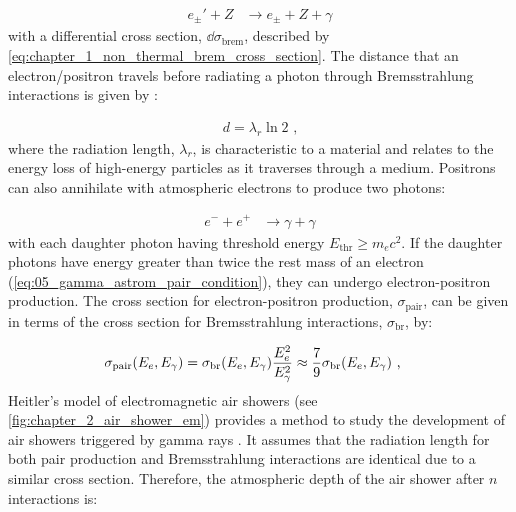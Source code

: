\begin{equation}
    \begin{aligned}
    e_\pm' + Z & \rightarrow e_{\pm} + Z + \gamma
    \end{aligned}
\end{equation}
\noindent with a differential cross section, $\dd{\sigma}_\text{brem}$, described by \autoref{eq:chapter_1_non_thermal_brem_cross_section}. The distance that an \mbox{electron/positron} travels before radiating a photon through Bremsstrahlung interactions is given by \citep{MATTHEWS2005387}:

\begin{equation}
    \begin{aligned}
    d=\lambda_r \ln 2\text{ ,}
    \end{aligned}
\end{equation}
\noindent where the radiation length, $\lambda_r$, is characteristic to a material and relates to the energy loss of high-energy particles as it traverses through a medium.
\newpar 
Positrons can also annihilate with atmospheric electrons to produce two photons:

\begin{equation}
    \begin{aligned}
    e^- + e^+&\rightarrow \gamma + \gamma
    \end{aligned}
\end{equation}
with each daughter photon having threshold energy $E_\text{thr}\geq m_ec^2$. If the daughter photons have energy greater than twice the rest mass of an electron (\autoref{eq:05_gamma_astrom_pair_condition}), they can undergo electron-positron production. The cross section for electron-positron production, $\sigma_\text{pair}$, can be given in terms of the cross section for Bremsstrahlung interactions, $\sigma_\text{br}$, by:

\begin{equation}
    \begin{aligned}
    \sigma_\text{pair}\qty(E_e,E_\gamma)&=\sigma_\text{br}\qty(E_e,E_\gamma)\frac{E_e^2}{E_\gamma^2}\approx \frac{7}{9}\sigma_\text{br}\qty(E_e,E_\gamma)\text{ ,}
    \end{aligned} \label{eq:chapter_2_pair_prod_cs}
\end{equation}
\newpar 
Heitler's model of electromagnetic air showers (see \autoref{fig:chapter_2_air_shower_em}) provides a method to study the development of air showers triggered by gamma rays \citep{1934RSPSA.146...83B}. It assumes that the radiation length for both pair production and Bremsstrahlung interactions are identical due to a similar cross section. Therefore, the atmospheric depth of the air shower after $n$ interactions is:


